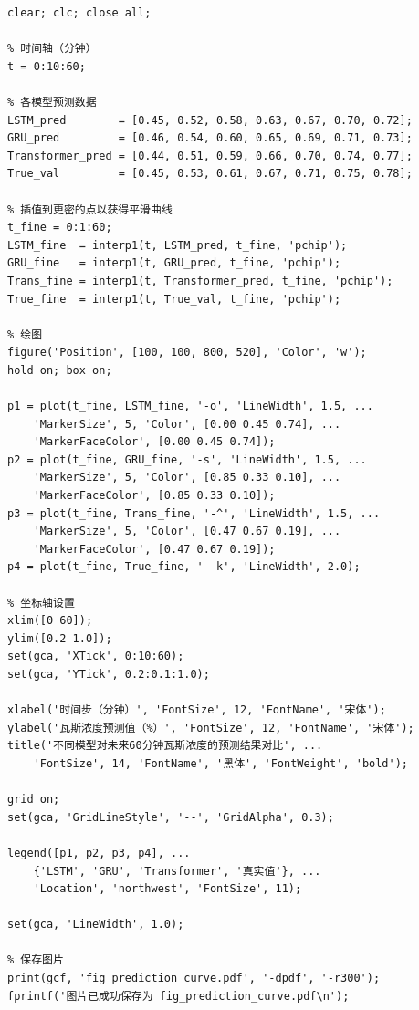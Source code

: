 \documentclass[twocolumn,a4paper]{ctexart}
\numberwithin{equation}{section}
\begin{document}
\begin{lstlisting}[caption={不同模型对未来60分钟瓦斯浓度预测结果对比绘图代码},label={lst:pred_curve}]
clear; clc; close all;

% 时间轴（分钟）
t = 0:10:60;

% 各模型预测数据
LSTM_pred        = [0.45, 0.52, 0.58, 0.63, 0.67, 0.70, 0.72];
GRU_pred         = [0.46, 0.54, 0.60, 0.65, 0.69, 0.71, 0.73];
Transformer_pred = [0.44, 0.51, 0.59, 0.66, 0.70, 0.74, 0.77];
True_val         = [0.45, 0.53, 0.61, 0.67, 0.71, 0.75, 0.78];

% 插值到更密的点以获得平滑曲线
t_fine = 0:1:60;
LSTM_fine  = interp1(t, LSTM_pred, t_fine, 'pchip');
GRU_fine   = interp1(t, GRU_pred, t_fine, 'pchip');
Trans_fine = interp1(t, Transformer_pred, t_fine, 'pchip');
True_fine  = interp1(t, True_val, t_fine, 'pchip');

% 绘图
figure('Position', [100, 100, 800, 520], 'Color', 'w');
hold on; box on;

p1 = plot(t_fine, LSTM_fine, '-o', 'LineWidth', 1.5, ...
    'MarkerSize', 5, 'Color', [0.00 0.45 0.74], ...
    'MarkerFaceColor', [0.00 0.45 0.74]);
p2 = plot(t_fine, GRU_fine, '-s', 'LineWidth', 1.5, ...
    'MarkerSize', 5, 'Color', [0.85 0.33 0.10], ...
    'MarkerFaceColor', [0.85 0.33 0.10]);
p3 = plot(t_fine, Trans_fine, '-^', 'LineWidth', 1.5, ...
    'MarkerSize', 5, 'Color', [0.47 0.67 0.19], ...
    'MarkerFaceColor', [0.47 0.67 0.19]);
p4 = plot(t_fine, True_fine, '--k', 'LineWidth', 2.0);

% 坐标轴设置
xlim([0 60]);
ylim([0.2 1.0]);
set(gca, 'XTick', 0:10:60);
set(gca, 'YTick', 0.2:0.1:1.0);

xlabel('时间步（分钟）', 'FontSize', 12, 'FontName', '宋体');
ylabel('瓦斯浓度预测值（%）', 'FontSize', 12, 'FontName', '宋体');
title('不同模型对未来60分钟瓦斯浓度的预测结果对比', ...
    'FontSize', 14, 'FontName', '黑体', 'FontWeight', 'bold');

grid on;
set(gca, 'GridLineStyle', '--', 'GridAlpha', 0.3);

legend([p1, p2, p3, p4], ...
    {'LSTM', 'GRU', 'Transformer', '真实值'}, ...
    'Location', 'northwest', 'FontSize', 11);

set(gca, 'LineWidth', 1.0);

% 保存图片
print(gcf, 'fig_prediction_curve.pdf', '-dpdf', '-r300');
fprintf('图片已成功保存为 fig_prediction_curve.pdf\n');
\end{lstlisting}

\newpage
\end{document}
